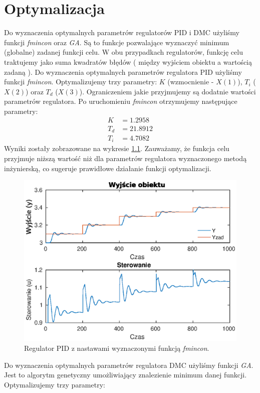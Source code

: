 \chapter{Optymalizacja}
Do wyznaczenia optymalnych parametrów regulatorów PID i DMC użyliśmy funkcji \emph{fmincon} oraz \emph{GA}. Są to funkcje pozwalające wyznaczyć minimum (globalne) zadanej funkcji celu.
W obu przypadkach regulatorów, funkcję celu traktujemy jako suma kwadratów błędów ( między wyjściem obiektu a wartością zadaną ).
Do wyznaczenia optymalnych parametrów regulatora PID użyliśmy funkcji \emph{fmincon}. Optymalizujemy trzy parametry: $K$ (wzmocnienie - $X(1)$), $T_i$ ($X(2)$) oraz $T_d$ ($X(3)$).
Ograniczeniem jakie przyjmujemy są dodatnie wartości parametrów regulatora. Po uruchomieniu \emph{fmincon} otrzymujemy następujące parametry:
\begin{align}
  K &= 1.2958 \nonumber \\
  T_d &= 21.8912 \\
  T_i &= 4.7082 \nonumber
\end{align}
Wyniki zostały zobrazowane na wykresie \ref{fig:optim_pid}.
Zauważamy, że funkcja celu przyjmuje niższą wartość niż dla parametrów regulatora wyznaczonego metodą inżynierską, co sugeruje prawidłowe działanie funkcji optymalizacji.
\begin{figure}
  \includegraphics{wykresy/optim_pid.eps}
  \caption{Regulator PID z nastawami wyznaczonymi funkcją \emph{fmincon}.}
  \label{fig:optim_pid}
\end{figure}
Do wyznaczenia optymalnych parametrów regulatora DMC użyliśmy funkcji \emph{GA}. Jest to algorytm genetyczny umożliwiający znalezienie minimum danej funkcji. Optymalizujemy trzy parametry:
